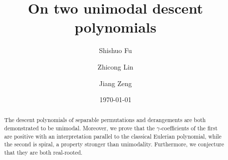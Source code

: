 \documentclass[12pt]{amsart}
\numberwithin{equation}{section}
\theoremstyle{plain}
\theoremstyle{definition}
\begin{document}
\title[Unimodal descent polynomials]{On two unimodal descent polynomials}

\author[S. Fu]{Shishuo Fu}
\address[Shishuo Fu]{College of Mathematics and Statistics, Chongqing University, Chongqing 401331, P.R. China} 




\author[Z. Lin]{Zhicong Lin}
\address[Zhicong Lin]{School of Science, Jimei University, Xiamen 361021,
P.R. China
\& CAMP, National Institute for Mathematical Sciences, Daejeon 305-811, Republic of Korea} 


\author[J. Zeng]{Jiang Zeng}

\address[Jiang Zeng]{Institut Camille Jordan,  Universit\'{e} Claude Bernard Lyon 1, France}
  
\date{\today}

\begin{abstract} 
The descent polynomials of separable permutations and derangements are 
both  demonstrated to be  
unimodal. Moreover, 
we prove that the $\gamma$-coefficients of 
the first   are positive with
an  interpretation parallel 
 to the classical Eulerian polynomial, while
the second  is spiral, a  property stronger than unimodality. 
Furthermore, we conjecture that they are both real-rooted.
\end{abstract}

\maketitle
\end{document}
